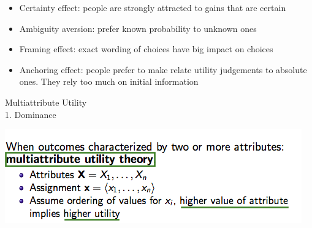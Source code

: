 \documentclass[12pt]{article}
\begin{document}
\begin{tcolorbox}
\begin{itemize}
\item Certainty effect: people are strongly attracted to gains that are certain
\item Ambiguity aversion: prefer known probability to unknown ones
\item Framing effect: exact wording of choices have big impact on choices
\item Anchoring effect: people prefer to make relate utility judgements to absolute ones. They rely too much on initial information
\end{itemize}
\end{tcolorbox}

\noindent
{\large{Multiattribute Utility}}\\
1. Dominance
\begin{tcolorbox}
\includegraphics[scale=0.6]{p16}
\end{tcolorbox}
\end{document}
